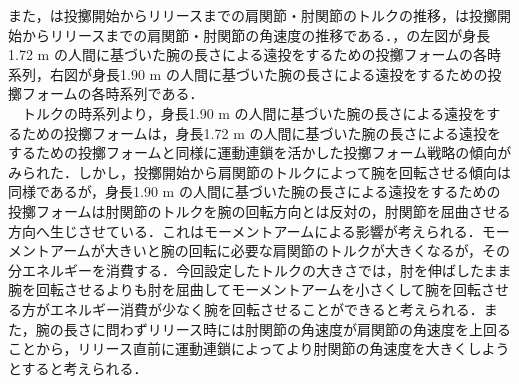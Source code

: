 また，は投擲開始からリリースまでの肩関節・肘関節のトルクの推移，は投擲開始からリリースまでの肩関節・肘関節の角速度の推移である．，の左図が身長1.72 m の人間に基づいた腕の長さによる遠投をするための投擲フォームの各時系列，右図が身長1.90 m の人間に基づいた腕の長さによる遠投をするための投擲フォームの各時系列である．\\
　トルクの時系列より，身長1.90 m の人間に基づいた腕の長さによる遠投をするための投擲フォームは，身長1.72 m の人間に基づいた腕の長さによる遠投をするための投擲フォームと同様に運動連鎖を活かした投擲フォーム戦略の傾向がみられた．しかし，投擲開始から肩関節のトルクによって腕を回転させる傾向は同様であるが，身長1.90 m の人間に基づいた腕の長さによる遠投をするための投擲フォームは肘関節のトルクを腕の回転方向とは反対の，肘関節を屈曲させる方向へ生じさせている．これはモーメントアームによる影響が考えられる．モーメントアームが大きいと腕の回転に必要な肩関節のトルクが大きくなるが，その分エネルギーを消費する．今回設定したトルクの大きさでは，肘を伸ばしたまま腕を回転させるよりも肘を屈曲してモーメントアームを小さくして腕を回転させる方がエネルギー消費が少なく腕を回転させることができると考えられる．また，腕の長さに問わずリリース時には肘関節の角速度が肩関節の角速度を上回ることから，リリース直前に運動連鎖によってより肘関節の角速度を大きくしようとすると考えられる．

\clearpage
{}


